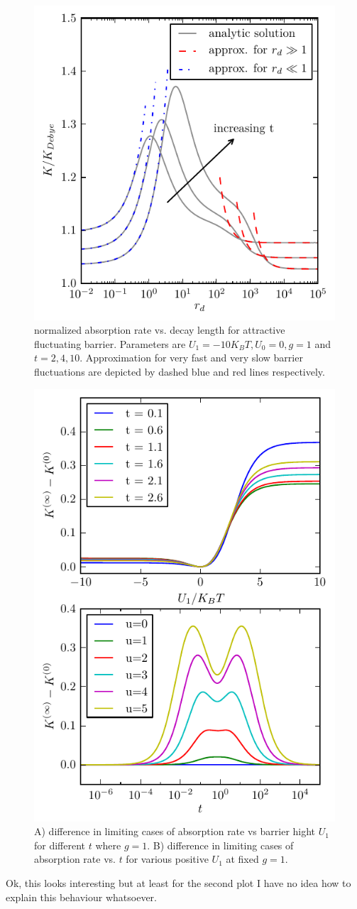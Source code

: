 \documentclass[twocolumn,superscriptaddress]{revtex4}
\begin{document}
\vspace{-2 cm}
\begin{figure}[H]
\includegraphics[width= .5 \textwidth]{plots/att_barrier.pdf}
\caption{normalized absorption rate vs. decay length for attractive fluctuating barrier. \newline Parameters are $U_1 = -10 K_B T, U_0= 0, g = 1$ and $t=2,4,10$. Approximation for very fast and very slow barrier fluctuations are depicted by dashed blue and red lines respectively.}
\label{fig3}
\end{figure}
\begin{figure}[H]
\includegraphics[width= .5 \textwidth]{plots/diff_plot.pdf}
\caption{A) difference in limiting cases of absorption rate vs barrier hight $U_1$ for different $t$ where $g=1$. \newline B) difference in limiting cases of absorption rate vs. $t$ for various positive $U_1$ at fixed $g=1$.}
\label{fig4}
\end{figure}
Ok, this looks interesting but at least for the second plot I have no idea how to explain this behaviour whatsoever.
\end{document}
